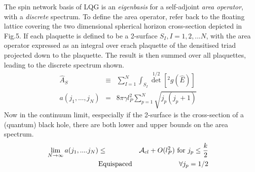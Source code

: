 \documentclass[11pt]{article}
\begin{document}
The spin network basis of LQG is an {\it eigenbasis} for a self-adjoint {\it area operator}, with a {\it discrete} spectrum. To define the area operator, refer back to the floating lattice covering the two dimensional spherical horizon cross-section depicted in Fig.5. If each plaquette is defined to be a 2-surface $S_I,I=1,2, ...N$, with the area operator expressed as an integral over erach plaquette of the densitised triad projected down to the plaquette. The result is then summed over all plaquettes, leading to  
the discrete spectrum shown. 
\begin{eqnarray}
{\hat {A}}_S &\equiv & \sum_{I=1}^N \int_{S_I} {\det}^{1/2}[ ^2g({\hat E})] \label{aop} \\
a(j_1, \dots, j_N) &=& 8\pi \gamma l_P^2 \sum_{p=1}^N  \sqrt{j_p(j_p+1)} \label{aeig}
\end{eqnarray}
Now in the continuum limit, eespecially if the 2-surface is the cross-section of a (quantum) black hole, there are both lower and upper bounds on the area spectrum. 
\begin{eqnarray} 
\lim_{N \rightarrow \infty} a(j_1,....j_N) & \leq & {\cal A}_{cl} + O(l_P^2) ~{\rm for}~ j_p \leq \frac{k}{2} \\ 
& {\rm Equispaced} & \forall j_p=1/2
\end{eqnarray} 
\end{document}
